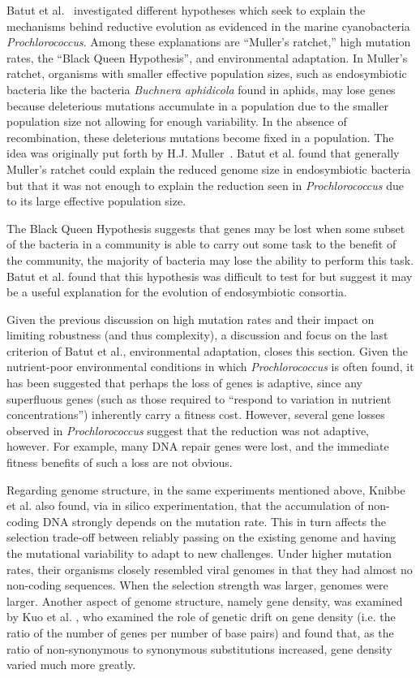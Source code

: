 Batut et al.~\cite{Batut.2014} investigated different hypotheses which seek to explain the mechanisms behind reductive evolution as evidenced in the marine cyanobacteria \textit{Prochlorococcus}. Among these explanations are ``Muller's ratchet,'' high mutation rates, the ``Black Queen Hypothesis'', and environmental adaptation. In Muller's ratchet, organisms with smaller effective population sizes, such as endosymbiotic bacteria like the bacteria \textit{Buchnera aphidicola} found in aphids, may lose genes because deleterious mutations accumulate in a population due to the smaller population size not allowing for enough variability. In the absence of recombination, these deleterious mutations become fixed in a population. The idea was originally put forth by H.J. Muller~\cite{MullersRatchet}. Batut et al. found that generally Muller's ratchet could explain the reduced genome size in endosymbiotic bacteria but that it was not enough to explain the reduction seen in \textit{Prochlorococcus} due to its large effective population size. 

The Black Queen Hypothesis suggests that genes may be lost when some subset of the bacteria in a community is able to carry out some task to the benefit of the community, the majority of bacteria may lose the ability to perform this task. Batut et al. found that this hypothesis was difficult to test for but suggest it may be a useful explanation for the evolution of endosymbiotic consortia. 

Given the previous discussion on high mutation rates and their impact on limiting robustness (and thus complexity), a discussion and focus on the last criterion of Batut et al., environmental adaptation, closes this section. Given the nutrient-poor environmental conditions in which \textit{Prochlorococcus} is often found, it has been suggested that perhaps the loss of genes is adaptive, since any superfluous genes (such as those required to ``respond to variation in nutrient concentrations'') inherently carry a fitness cost. However, several gene losses observed in \textit{Prochlorococcus} suggest that the reduction was not adaptive, however. For example, many DNA repair genes were lost, and the immediate fitness benefits of such a loss are not obvious. 

Regarding genome structure, in the same experiments mentioned above, Knibbe et al.\cite{Knibbe2007} also found, via in silico experimentation, that the accumulation of non-coding DNA strongly depends on the mutation rate. This in turn affects the selection trade-off between reliably passing on the existing genome and having the mutational variability to adapt to new challenges.  Under higher mutation rates, their organisms closely resembled viral genomes in that they had almost no non-coding sequences. When the selection strength was larger, genomes were larger.  Another aspect of genome structure, namely gene density, was examined by Kuo et al. \cite{kuo2009consequences}, who examined the role of genetic drift on gene density (i.e. the ratio of the number of genes per number of base pairs) and found that, as the ratio of non-synonymous to synonymous substitutions increased, gene density varied much more greatly.
